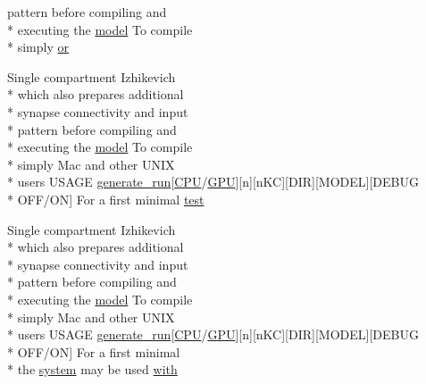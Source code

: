 \begin{DoxyCompactItemize}
pattern before compiling and \\*
executing the \hyperlink{README_8txt_a69fd801b7213948c12d9dd7eebb3ed14}{model} To compile \\*
simply \hyperlink{userproject_2OneComp__project_2README_8txt_ad3dfb6f90a37dd568d9e93856bbd2b79}{or}
\item 
Single compartment Izhikevich \\*
which also prepares additional \\*
synapse connectivity and input \\*
pattern before compiling and \\*
executing the \hyperlink{README_8txt_a69fd801b7213948c12d9dd7eebb3ed14}{model} To compile \\*
simply Mac and other U\+N\+I\+X \\*
users U\+S\+A\+G\+E \hyperlink{userproject_2MBody__userdef__project_2README_8txt_a320a215d1e27b4de394be70e90d22863}{generate\+\_\+run}\mbox{[}\hyperlink{README_8txt_a74a069e3c75797de2636c4dd14daa147}{C\+P\+U}/\hyperlink{modelSpec_8h_a39cb9803524b6f3b783344b2f89867b4}{G\+P\+U}\mbox{]}\mbox{[}n\mbox{]}\mbox{[}n\+K\+C\mbox{]}\mbox{[}D\+I\+R\mbox{]}\mbox{[}M\+O\+D\+E\+L\mbox{]}\mbox{[}D\+E\+B\+U\+G \\*
O\+F\+F/O\+N\mbox{]} For a first minimal \hyperlink{userproject_2OneComp__project_2README_8txt_aea3d559e4d6fbbcd1723e4b488214567}{test}
\item 
Single compartment Izhikevich \\*
which also prepares additional \\*
synapse connectivity and input \\*
pattern before compiling and \\*
executing the \hyperlink{README_8txt_a69fd801b7213948c12d9dd7eebb3ed14}{model} To compile \\*
simply Mac and other U\+N\+I\+X \\*
users U\+S\+A\+G\+E \hyperlink{userproject_2MBody__userdef__project_2README_8txt_a320a215d1e27b4de394be70e90d22863}{generate\+\_\+run}\mbox{[}\hyperlink{README_8txt_a74a069e3c75797de2636c4dd14daa147}{C\+P\+U}/\hyperlink{modelSpec_8h_a39cb9803524b6f3b783344b2f89867b4}{G\+P\+U}\mbox{]}\mbox{[}n\mbox{]}\mbox{[}n\+K\+C\mbox{]}\mbox{[}D\+I\+R\mbox{]}\mbox{[}M\+O\+D\+E\+L\mbox{]}\mbox{[}D\+E\+B\+U\+G \\*
O\+F\+F/O\+N\mbox{]} For a first minimal \\*
the \hyperlink{userproject_2MBody__userdef__project_2README_8txt_aa59f82cbdc8faecbe63db8c36a91a73c}{system} may be used \hyperlink{userproject_2OneComp__project_2README_8txt_ace09bb40fbf4457ad9a9340a67a4fa9a}{with}
\end{DoxyCompactItemize}


